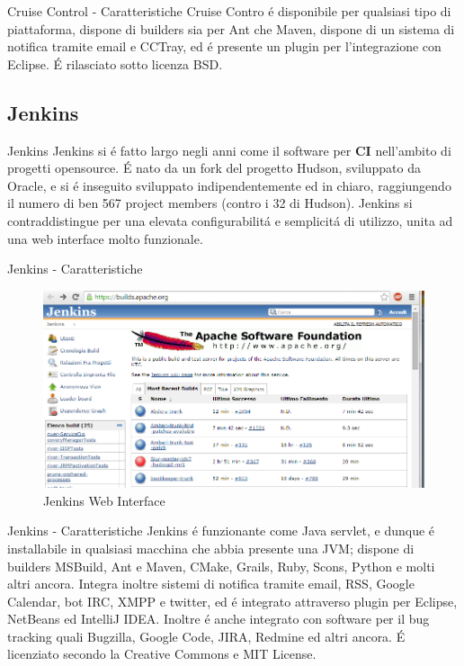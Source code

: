 \documentclass{beamer}
\begin{document}
\begin{frame}{Cruise Control - Caratteristiche}
Cruise Contro \'e disponibile per qualsiasi tipo di piattaforma, dispone di builders sia per Ant che Maven, dispone di un sistema di
 notifica tramite email e CCTray, ed \'e presente un plugin per l'integrazione con Eclipse.
\newline \'E rilasciato sotto licenza BSD.
\end{frame}


\subsection{Jenkins}
\begin{frame}{Jenkins}
Jenkins si \'e fatto largo negli anni come il software per \textbf{CI} nell'ambito di progetti opensource. \'E nato da un fork del
progetto Hudson, sviluppato da Oracle, e si \'e inseguito sviluppato indipendentemente ed in chiaro, raggiungendo il numero di
ben 567 project members (contro i 32 di Hudson).
\newline
Jenkins si contraddistingue per una elevata configurabilit\'a e semplicit\'a di utilizzo, unita ad una web interface molto funzionale.
\end{frame}


\begin{frame}{Jenkins - Caratteristiche}
\begin{figure}
  \centering
  \includegraphics[scale=0.35]{images/jenkins.png}
  \caption{Jenkins Web Interface}
\end{figure}
\end{frame}


\begin{frame}{Jenkins - Caratteristiche}
Jenkins \'e funzionante come Java servlet, e dunque \'e installabile in qualsiasi macchina che abbia presente una JVM; dispone
di builders  MSBuild, Ant e Maven, CMake, Grails, Ruby, Scons, Python e molti altri ancora. Integra inoltre sistemi di notifica
tramite email, RSS, Google Calendar, bot IRC, XMPP e twitter, ed \'e integrato attraverso plugin per Eclipse, NetBeans ed 
IntelliJ IDEA. Inoltre \'e anche integrato con software per il bug tracking quali Bugzilla, Google Code, JIRA, Redmine ed altri
ancora. \'E licenziato secondo la Creative Commons e MIT License.
\end{frame}
\end{document}
